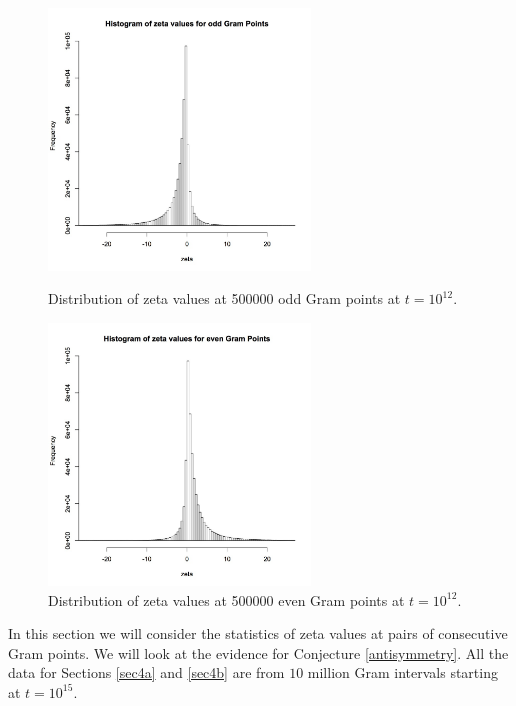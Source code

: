 \documentclass[twoside]{article}
\begin{document}
\begin{figure}
\centering
\includegraphics[width=0.62\textwidth]{ozeta.jpg}
\caption[]{ 
  Distribution of zeta values at 500000 odd Gram points  at $t = 10^{12}$.
 }
\vspace{1mm}
\label{oddhist}

\includegraphics[width=0.62\textwidth]{ezeta.jpg}
\caption[]{ 
   Distribution of zeta values at 500000 even Gram points  at $t = 10^{12}$.
 }
\label{evenhist}
\vspace{1mm}
\end{figure}

In this section we will consider the statistics of zeta values at pairs of consecutive Gram points. We will look at the evidence for Conjecture \ref{antisymmetry}.  All the data for Sections \ref{sec4a} and \ref{sec4b}  are from $10$ million Gram intervals starting at $t=10^{15}$.
\end{document}
